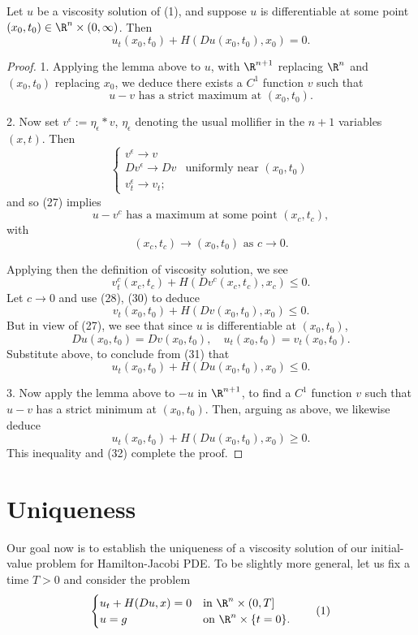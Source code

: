\begin{theorem}
\label{thm:consistency-viscosity-solutions}
Let $u$ be a viscosity solution of (1), and suppose $u$ is differentiable at some point $(x_0, t_0) \in \R^n \times (0, \infty)$. Then
\[
u_t(x_0, t_0) + H(Du(x_0, t_0), x_0) = 0.
\]
\end{theorem}
\begin{proof}
1. Applying the lemma above to $u$, with $\R^{n+1}$ replacing $\R^n$ and $(x_0, t_0)$ replacing $x_0$, we deduce there exists a $C^1$ function $v$ such that
\[
u - v \text{ has a strict maximum at } (x_0, t_0).
\tag{27}
\]

2. Now set $v^\epsilon := \eta_\epsilon * v$, $\eta_\epsilon$ denoting the usual mollifier in the $n + 1$ variables $(x,t)$. Then
\[
\begin{cases} v^\epsilon \to v \\ Dv^\epsilon \to Dv & \text{uniformly near } (x_0, t_0) \\ v_t^\epsilon \to v_t; \end{cases}
\tag{28}
\]
and so (27) implies
\[
u - v^c \text{ has a maximum at some point } (x_c, t_c),
\tag{29}
\]
with
\[
(x_c, t_c) \to (x_0, t_0) \text{ as } c \to 0.
\tag{30}
\]

Applying then the definition of viscosity solution, we see
\[
v_t^c(x_c, t_c) + H(Dv^c(x_c, t_c), x_c) \le 0.
\]
Let $c \to 0$ and use (28), (30) to deduce
\[
v_t(x_0, t_0) + H(Dv(x_0, t_0), x_0) \le 0.
\tag{31}
\]
But in view of (27), we see that since $u$ is differentiable at $(x_0, t_0)$,
\[
Du(x_0, t_0) = Dv(x_0, t_0), \quad u_t(x_0, t_0) = v_t(x_0, t_0).
\]
Substitute above, to conclude from (31) that
\[
u_t(x_0, t_0) + H(Du(x_0, t_0), x_0) \le 0.
\tag{32}
\]

3. Now apply the lemma above to $-u$ in $\R^{n+1}$, to find a $C^1$ function $v$ such that $u - v$ has a strict minimum at $(x_0, t_0)$. Then, arguing as above, we likewise deduce
\[
u_t(x_0, t_0) + H(Du(x_0, t_0), x_0) \ge 0.
\]
This inequality and (32) complete the proof.
\end{proof}

\section{Uniqueness}
\label{sec:hj-uniqueness}

Our goal now is to establish the uniqueness of a viscosity solution of our initial-value problem for Hamilton-Jacobi PDE. To be slightly more general, let us fix a time $T > 0$ and consider the problem
\[
\begin{cases} u_t + H(Du, x) = 0 & \text{in } \R^n \times (0, T] \\ u = g & \text{on } \R^n \times \{t = 0\}. \end{cases}
\tag{1}
\]

